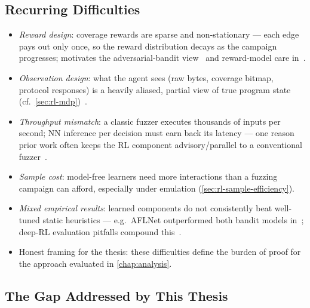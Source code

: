\subsection{Recurring Difficulties}\label{sec:rlfuzz-difficulties}

\begin{itemize}
  \item \emph{Reward design}: coverage rewards are sparse and non-stationary --- each edge pays
    out only once, so the reward distribution decays as the campaign progresses; motivates the
    adversarial-bandit view~\cite{borcherding_bandits_2023} and reward-model care
    in~\cite{wang_syzvegas_2021}.
  \item \emph{Observation design}: what the agent sees (raw bytes, coverage bitmap, protocol
    responses) is a heavily aliased, partial view of true program state
    (cf.\ \cref{sec:rl-mdp})~\cite{bottinger_deep_2018}.
  \item \emph{Throughput mismatch}: a classic fuzzer executes thousands of inputs per second;
    NN inference per decision must earn back its latency --- one reason prior work often keeps the
    RL component advisory/parallel to a conventional fuzzer~\cite{binosi_rainfuzz_2023}.
  \item \emph{Sample cost}: model-free learners need more interactions than a fuzzing campaign
    can afford, especially under emulation (\cref{sec:rl-sample-efficiency}).
  \item \emph{Mixed empirical results}: learned components do not consistently beat well-tuned
    static heuristics --- e.g.\ AFLNet outperformed both bandit models
    in~\cite{borcherding_bandits_2023}; deep-RL evaluation pitfalls compound
    this~\cite{henderson_deep_2019}.
  \item Honest framing for the thesis: these difficulties define the burden of proof for the
    approach evaluated in \cref{chap:analysis}.
\end{itemize}

\subsection{The Gap Addressed by This Thesis}\label{sec:rlfuzz-gap}

